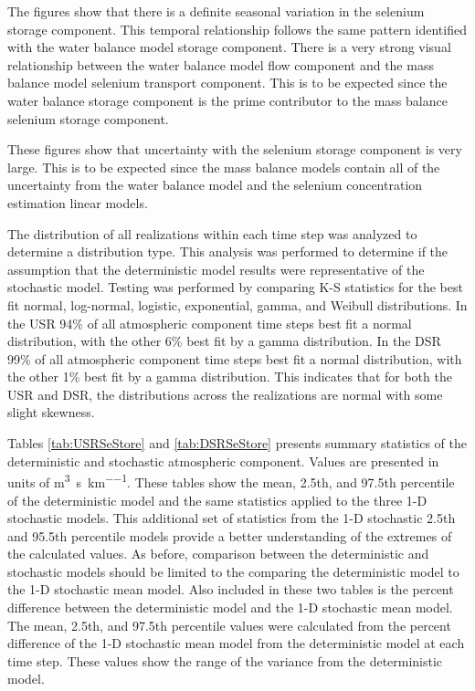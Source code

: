 \begin{linenumbers}
The figures show that there is a definite seasonal variation in the selenium storage component.  This temporal relationship follows the same pattern identified with the water balance model storage component.  There is a very strong visual relationship between the water balance model flow component and the mass balance model selenium transport component.  This is to be expected since the water balance storage component is the prime contributor to the mass balance selenium storage component.

These figures show that uncertainty with the selenium storage component is very large.  This is to be expected since the mass balance models contain all of the uncertainty from the water balance model and the selenium concentration estimation linear models.

The distribution of all realizations within each time step was analyzed to determine a distribution type.  This analysis was performed to determine if the assumption that the deterministic model results were representative of the stochastic model.  Testing was performed by comparing K-S statistics for the best fit normal, log-normal, logistic, exponential, gamma, and Weibull distributions.  In the USR 94\% of all atmospheric component time steps best fit a normal distribution, with the other 6\% best fit by a gamma distribution.  In the DSR 99\% of all atmospheric component time steps best fit a normal distribution, with the other 1\% best fit by a gamma distribution.  This indicates that for both the USR and DSR, the distributions across the realizations are normal with some slight skewness. 

Tables \ref{tab:USRSeStore} and \ref{tab:DSRSeStore} presents summary statistics of the deterministic and stochastic atmospheric component.  Values are presented in units of \si{\cubic\meter\per\second\per\kilo\meter}.   These tables show the mean, 2.5th, and 97.5th percentile of the deterministic model and the same statistics applied to the three 1-D stochastic models.  This additional set of statistics from the 1-D stochastic 2.5th and 95.5th percentile models provide a better understanding of the extremes of the calculated values.  As before, comparison between the deterministic and stochastic models should be limited to the comparing the deterministic model to the 1-D stochastic mean model.  Also included in these two tables is the percent difference between the deterministic model and the 1-D stochastic mean model.  The mean, 2.5th, and 97.5th percentile values were calculated from the percent difference of the 1-D stochastic mean model from the deterministic model at each time step.  These values show the range of the variance from the deterministic model.


\end{linenumbers}
